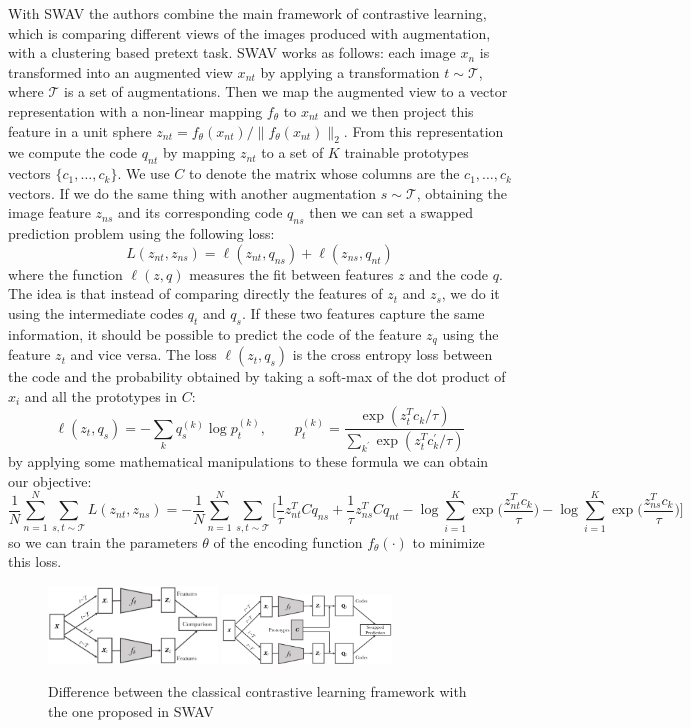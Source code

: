 With SWAV the authors combine the main framework of contrastive learning, which is comparing different views of the images produced with augmentation, with a clustering based pretext task. SWAV works as follows: each image $x_n$ is transformed into an augmented view $x_{nt}$ by applying a transformation $t \sim \mathcal{T}$, where $\mathcal{T}$ is a set of augmentations. Then we map the augmented view to a vector representation with a non-linear mapping $f_\theta$ to $x_{nt}$ and we then project this feature in a unit sphere $z_{nt} = f_\theta(x_{nt})/\lVert f_\theta(x_{nt}) \rVert_2$. From this representation we compute the code $q_{nt}$ by mapping $z_{nt}$ to a set of $K$ trainable prototypes vectors $\{c_1, \dots, c_k\}$. We use $C$ to denote the matrix whose columns are the $c_1, \dots, c_k$ vectors. If we do the same thing with another augmentation $s \sim \mathcal{T}$, obtaining the image feature $z_{ns}$ and its corresponding code $q_{ns}$ then we can set a swapped prediction problem using the following loss:
\[ L(z_{nt}, z_{ns}) = \ell(z_{nt}, q_{ns}) + \ell(z_{ns}, q_{nt}) \]
where the function $\ell(z, q)$ measures the fit between features $z$ and the code $q$. The idea is that instead of comparing directly the features of $z_t$ and $z_s$, we do it using the intermediate codes $q_t$ and $q_s$. If these two features capture the same information, it should be possible to predict the code of the feature $z_q$ using the feature $z_t$ and vice versa. The loss $\ell(z_t, q_s)$ is the cross entropy loss between the code and the probability obtained by taking a soft-max of the dot product of $x_i$ and all the prototypes in $C$:
\[\ell(z_t, q_s) = -\sum_k q_s^{(k)}\log p_t^{(k)}, \qquad p_t^{(k)} = \frac{\exp(z_t^Tc_k/\tau)}{\sum_{k^\prime}\exp(z_t^Tc_k^\prime/\tau)}\]
by applying some mathematical manipulations to these formula we can obtain our objective: 
\[\frac{1}{N}\sum_{n=1}^N \sum_{s, t \sim \mathcal{T}}L(z_{nt}, z_{ns}) = -\frac{1}{N}\sum_{n=1}^N \sum_{s, t \sim \mathcal{T}} \Bigg[ \frac{1}{\tau}z_{nt}^TCq_{ns} + \frac{1}{\tau}z_{ns}^TCq_{nt} - \log\sum_{i=1}^K\exp\Big(\frac{z_{nt}^Tc_k}{\tau}\Big) - \log\sum_{i=1}^K\exp\Big(\frac{z_{ns}^Tc_k}{\tau}\Big) \Bigg] \]
so we can train the parameters $\theta$ of the encoding function $f_\theta(\cdot)$ to minimize this loss.
\begin{figure}[H]
	\centering
	{\includegraphics[width=0.4\textwidth]{./images/swav_contrastive.png}}
	\qquad
	{\includegraphics[width=0.4\textwidth]{./images/swav_prediction.png}}
	\caption{Difference between the classical contrastive learning framework with the one proposed in SWAV}

\end{figure}
